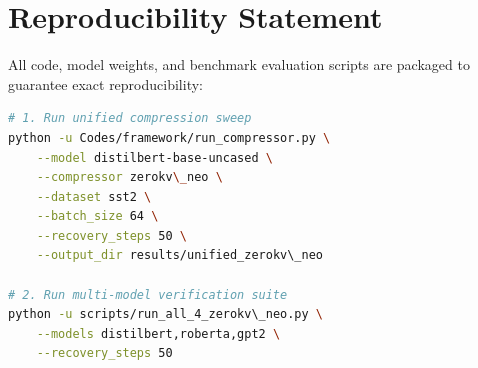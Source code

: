 \section{Reproducibility Statement}
All code, model weights, and benchmark evaluation scripts are packaged to guarantee exact reproducibility:
\begin{lstlisting}[language=bash]
# 1. Run unified compression sweep
python -u Codes/framework/run_compressor.py \
    --model distilbert-base-uncased \
    --compressor zerokv\_neo \
    --dataset sst2 \
    --batch_size 64 \
    --recovery_steps 50 \
    --output_dir results/unified_zerokv\_neo

# 2. Run multi-model verification suite
python -u scripts/run_all_4_zerokv\_neo.py \
    --models distilbert,roberta,gpt2 \
    --recovery_steps 50
\end{lstlisting}
